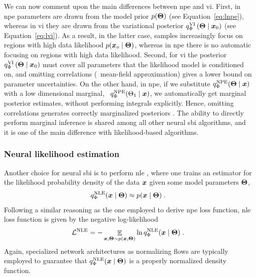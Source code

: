 We can now comment upon the main differences between \gls*{npe} and \gls*{vi}. First, in \gls*{npe} parameters are drawn from the model prior $p(\bm{\Theta})$ (see Equation~\eqref{eq:lnpe}), whereas in \gls*{vi} they are drawn from the variational posterior $q^\text{VI}_\Phi\left(\bm{\Theta} \mid \bm{x}_0\right)$ (see Equation~\eqref{eq:lvi}). As a result, in the latter case, samples increasingly focus on regions with high data likelihood $p(\bm{x}_o \mid \bm{\Theta})$, whereas in \gls*{npe} there is no  automatic focusing on regions with high data likelihood. Second, for \gls*{vi} the posterior  $q^\text{VI}_\Phi\left(\bm{\Theta} \mid \bm{x}_0\right)$ must cover all parameters that the likelihood model is conditioned on, and omitting correlations (\eg\ mean-field approximation) gives a lower bound on parameter uncertainties. On the other hand, in \gls*{npe}, if we substitute $q^\text{NPE}_\Phi(\bm{\Theta}\mid\bm{x})$ with a low dimensional marginal, \eg\ $q^\text{NPE}_\Phi(\Theta_1\mid\bm{x})$, we automatically get marginal posterior estimates, without performing integrals explicitly. Hence, omitting correlations generates correctly marginalized posteriors \cite{ambrogioni2019forward}. The ability to directly perform marginal inference is shared among all other neural \gls*{sbi} algorithms, and it is one of the main difference with likelihood-based algorithms. 


\subsubsection{Neural likelihood estimation}

Another choice for neural \gls*{sbi} is to perform {\gls*{nle}} \cite{Papamakarios:2018aa, Durkan:2018aa}, where one trains an estimator for the likelihood probability density of the data $\bm{x}$ given some model parameters $\bm{\Theta}$, 
\begin{equation}
    q^\text{NLE}_\Phi(\bm{x} \mid \bm{\Theta}) \approx p(\bm{x}\mid\bm{\Theta})\;.
\end{equation}
Following a similar reasoning as the one employed to derive \gls*{npe} loss function, \gls*{nle} loss function is given by the negative log-likelihood
%
\begin{equation}
	\mathcal{L}^\text{NLE}=-\mathop{\mathbb{E}}\limits_{\bm{x}, \bm{\Theta} \sim p(\bm{x}, \bm{\Theta})} \ln q^\text{NLE}_\Phi(\bm{x} \mid \bm{\Theta}) \;.
\end{equation}
%
Again, specialized network architectures as normalizing flows are typically employed to guarantee that $q^\text{NLE}_\Phi(\bm{x} \mid \bm{\Theta})$ is a properly normalized density function.

